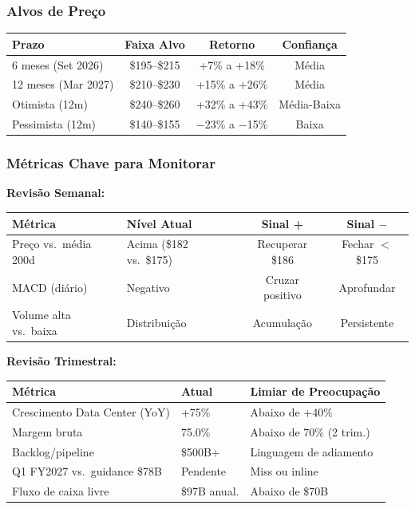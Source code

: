 \documentclass[11pt,a4paper]{article}
\begin{document}
\subsubsection{Alvos de Pre\c{c}o}

\begin{table}[h]
\centering
\begin{tabular}{lccc}
\toprule
\textbf{Prazo} & \textbf{Faixa Alvo} & \textbf{Retorno} & \textbf{Confian\c{c}a} \\
\midrule
6 meses (Set 2026) & \$195--\$215 & +7\% a +18\% & M\'edia \\
12 meses (Mar 2027) & \$210--\$230 & +15\% a +26\% & M\'edia \\
Otimista (12m) & \$240--\$260 & +32\% a +43\% & M\'edia-Baixa \\
Pessimista (12m) & \$140--\$155 & $-$23\% a $-$15\% & Baixa \\
\bottomrule
\end{tabular}
\end{table}

\subsubsection{M\'etricas Chave para Monitorar}

\textbf{Revis\~ao Semanal:}

\begin{table}[h]
\centering
\begin{tabularx}{\textwidth}{lXcc}
\toprule
\textbf{M\'etrica} & \textbf{N\'ivel Atual} & \textbf{Sinal +} & \textbf{Sinal $-$} \\
\midrule
Pre\c{c}o vs.\ m\'edia 200d & Acima (\$182 vs.\ \$175) & Recuperar \$186 & Fechar $<$\$175 \\
MACD (di\'ario) & Negativo & Cruzar positivo & Aprofundar \\
Volume alta vs.\ baixa & Distribui\c{c}\~ao & Acumula\c{c}\~ao & Persistente \\
\bottomrule
\end{tabularx}
\end{table}

\textbf{Revis\~ao Trimestral:}

\begin{table}[h]
\centering
\begin{tabularx}{\textwidth}{lXX}
\toprule
\textbf{M\'etrica} & \textbf{Atual} & \textbf{Limiar de Preocupa\c{c}\~ao} \\
\midrule
Crescimento Data Center (YoY) & +75\% & Abaixo de +40\% \\
Margem bruta & 75.0\% & Abaixo de 70\% (2 trim.) \\
Backlog/pipeline & \$500B+ & Linguagem de adiamento \\
Q1 FY2027 vs.\ guidance \$78B & Pendente & Miss ou inline \\
Fluxo de caixa livre & \$97B anual. & Abaixo de \$70B \\
\bottomrule
\end{tabularx}
\end{table}
\end{document}

